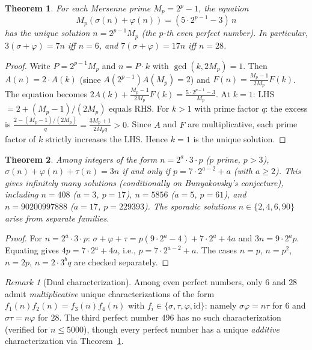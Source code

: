 \documentclass[11pt]{amsart}
\newtheorem{theorem}{Theorem}
\theoremstyle{remark}
\newtheorem*{remark}{Remark}
\begin{document}
\begin{theorem}\label{thm:seven-thirds}
For each Mersenne prime $M_p = 2^p - 1$, the equation
\[
  M_p(\sigma(n) + \varphi(n)) = (5 \cdot 2^{p-1} - 3) \, n
\]
has the unique solution $n = 2^{p-1} M_p$ (the $p$-th even perfect number).
In particular, $3(\sigma + \varphi) = 7n$ iff $n = 6$,
and $7(\sigma + \varphi) = 17n$ iff $n = 28$.
\end{theorem}

\begin{proof}
Write $P = 2^{p-1} M_p$ and $n = P \cdot k$ with $\gcd(k, 2M_p) = 1$.
Then $A(n) = 2 \cdot A(k)$ (since $A(2^{p-1}) A(M_p) = 2$)
and $F(n) = \frac{M_p - 1}{2M_p} F(k)$.
The equation becomes $2A(k) + \frac{M_p-1}{2M_p} F(k) = \frac{5 \cdot 2^{p-1}-3}{M_p}$.
At $k=1$: LHS $= 2 + (M_p-1)/(2M_p)$ equals RHS.
For $k > 1$ with prime factor $q$:
the excess is $\frac{2 - (M_p-1)/(2M_p)}{q} = \frac{3M_p+1}{2M_p q} > 0$.
Since $A$ and $F$ are multiplicative, each prime factor of $k$
strictly increases the LHS. Hence $k = 1$ is the unique solution.
\end{proof}

\begin{theorem}\label{thm:additive}
Among integers of the form $n = 2^a \cdot 3 \cdot p$ ($p$ prime, $p > 3$),
$\sigma(n) + \varphi(n) + \tau(n) = 3n$ if and only if
$p = 7 \cdot 2^{a-2} + a$ (with $a \geq 2$).
This gives infinitely many solutions (conditionally on Bunyakovsky's conjecture),
including $n = 408$ ($a=3$, $p=17$), $n = 5856$ ($a=5$, $p=61$),
and $n = 90200997888$ ($a=17$, $p=229393$).
The sporadic solutions $n \in \{2, 4, 6, 90\}$ arise from separate families.
\end{theorem}

\begin{proof}
For $n = 2^a \cdot 3 \cdot p$:
$\sigma + \varphi + \tau = p(9 \cdot 2^a - 4) + 7 \cdot 2^a + 4a$
and $3n = 9 \cdot 2^a p$.
Equating gives $4p = 7 \cdot 2^a + 4a$, i.e., $p = 7 \cdot 2^{a-2} + a$.
The cases $n = p$, $n = p^2$, $n = 2p$, $n = 2 \cdot 3^b q$ are checked separately.
\end{proof}

\begin{remark}[Dual characterization]
Among even perfect numbers, only $6$ and $28$ admit
\emph{multiplicative} unique characterizations of the form
$f_1(n) f_2(n) = f_3(n) f_4(n)$ with $f_i \in \{\sigma, \tau, \varphi, \mathrm{id}\}$:
namely $\sigma\varphi = n\tau$ for $6$ and $\sigma\tau = n\varphi$ for $28$.
The third perfect number $496$ has no such characterization
(verified for $n \leq 5000$), though every perfect number
has a unique \emph{additive} characterization via
Theorem~\ref{thm:seven-thirds}.
\end{remark}
\end{document}
